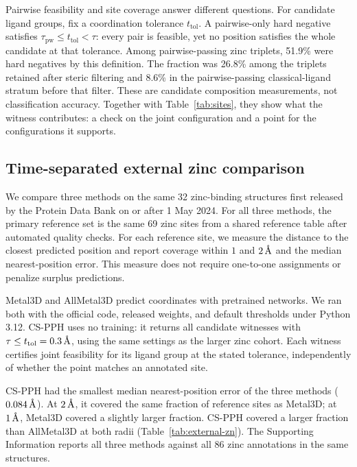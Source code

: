 \documentclass[11pt]{article}
\newcommand{\angstrom}{\ensuremath{\text{\normalfont\AA}}}
\newcommand{\pw}{\tau_{\mathrm{pw}}}
\begin{document}
Pairwise feasibility and site coverage answer different questions. For candidate ligand groups, fix a coordination tolerance $t_{\mathrm{tol}}$. A pairwise-only hard negative satisfies $\pw\leq t_{\mathrm{tol}}<\tau$: every pair is feasible, yet no position satisfies the whole candidate at that tolerance. Among pairwise-passing zinc triplets, 51.9\% were hard negatives by this definition. The fraction was 26.8\% among the triplets retained after steric filtering and 8.6\% in the pairwise-passing classical-ligand stratum before that filter. These are candidate composition measurements, not classification accuracy. Together with Table~\ref{tab:sites}, they show what the witness contributes: a check on the joint configuration and a point for the configurations it supports.

\subsection{Time-separated external zinc comparison}
\label{sec:external}

We compare three methods on the same 32 zinc-binding structures first released by the Protein Data Bank on or after 1 May 2024. For all three methods, the primary reference set is the same 69 zinc sites from a shared reference table after automated quality checks. For each reference site, we measure the distance to the closest predicted position and report coverage within $1$ and $2\,\angstrom$ and the median nearest-position error. This measure does not require one-to-one assignments or penalize surplus predictions.

Metal3D and AllMetal3D\citep{durr2023,durr2025} predict coordinates with pretrained networks. We ran both with the official code, released weights, and default thresholds under Python 3.12. CS-PPH uses no training: it returns all candidate witnesses with $\tau\leq t_{\mathrm{tol}}=0.3\,\angstrom$, using the same settings as the larger zinc cohort. Each witness certifies joint feasibility for its ligand group at the stated tolerance, independently of whether the point matches an annotated site.

CS-PPH had the smallest median nearest-position error of the three methods ($0.084\,\angstrom$). At $2\,\angstrom$, it covered the same fraction of reference sites as Metal3D; at $1\,\angstrom$, Metal3D covered a slightly larger fraction. CS-PPH covered a larger fraction than AllMetal3D at both radii (Table~\ref{tab:external-zn}). The Supporting Information reports all three methods against all 86 zinc annotations in the same structures.
\end{document}
